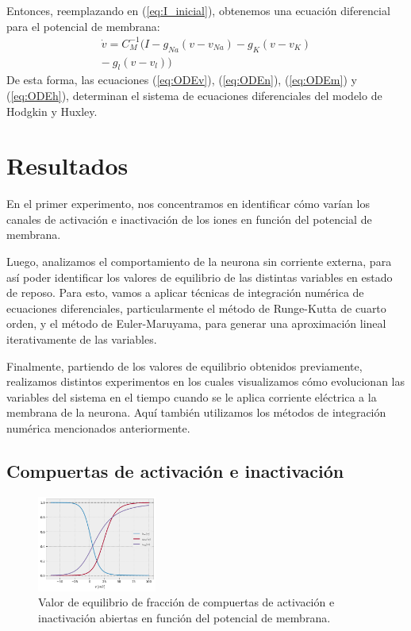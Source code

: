 \documentclass[aps,twocolumn,groupedaddress]{revtex4-2}
\begin{document}
Entonces, reemplazando en (\ref{eq:I_inicial}), obtenemos una ecuación diferencial para el potencial de membrana:
\begin{equation} \label{eq:ODEv}
\begin{split}
\dot{v} = C_M^{-1} ( I - g_{Na}(v - v_{Na}) - g_K(v - v_K) \\
-\ g_l(v - v_l))
\end{split}
\end{equation}
De esta forma, las ecuaciones (\ref{eq:ODEv}), (\ref{eq:ODEn}), (\ref{eq:ODEm}) y (\ref{eq:ODEh}), determinan el sistema de ecuaciones diferenciales del modelo de Hodgkin y Huxley.


\section{Resultados}
En el primer experimento, nos concentramos en identificar cómo varían los canales de activación e inactivación de los iones en función del potencial de membrana.

Luego, analizamos el comportamiento de la neurona sin corriente externa, para así poder identificar los valores de equilibrio de las distintas variables en estado de reposo. Para esto, vamos a aplicar técnicas de integración numérica de ecuaciones diferenciales, particularmente el método de Runge-Kutta de cuarto orden, y el método de Euler-Maruyama, para generar una aproximación lineal iterativamente de las variables.

Finalmente, partiendo de los valores de equilibrio obtenidos previamente, realizamos distintos experimentos en los cuales visualizamos cómo evolucionan las variables del sistema en el tiempo cuando se le aplica corriente eléctrica a la membrana de la neurona. Aquí también utilizamos los métodos de integración numérica mencionados anteriormente.

\subsection{Compuertas de activación e inactivación}
\begin{figure}[ht]
    \centering
    \includegraphics[width=0.35\textwidth]{figs/ej2_fracciones.png}
    \caption{Valor de equilibrio de fracción de compuertas de activación e inactivación abiertas en función del potencial de membrana.}
    \label{fig:ej2_fracciones}
\end{figure}
\end{document}
